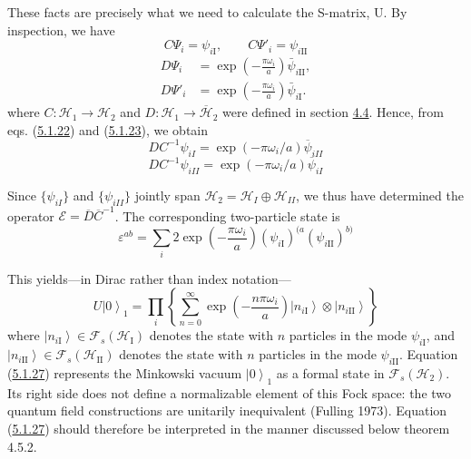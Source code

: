 \documentclass[11pt,a4paper]{article}
\providecommand{\ket}[1]{\left\lvert#1\right\rangle}
\begin{document}
These facts are precisely what we need to calculate the S-matrix, U. By inspection, we have
\begin{equation*}
C\Psi_i=\psi_{i\mathrm{I}},\qquad C\Psi'_i=\psi_{i\mathrm{II}} \tag{5.1.22}\label{eq:5.1.22}
\end{equation*}
\begin{equation*}
\begin{aligned}
D\Psi_i&=\exp\left(-\frac{\pi\omega_i}{a}\right)\bar\psi_{i\mathrm{II}},\\
D\Psi'_i&=\exp\left(-\frac{\pi\omega_i}{a}\right)\bar\psi_{i\mathrm{I}}.
\end{aligned}\tag{5.1.23}\label{eq:5.1.23}
\end{equation*}
where \(C: \mathcal{H}_1 \to \mathcal{H}_2\) and \(D: \mathcal{H}_1 \to \overline{\mathcal{H}}_2\) were defined in section \hyperlink{sec:4.4}{4.4}. Hence, from eqs. (\hyperref[eq:5.1.22]{5.1.22}) and (\hyperref[eq:5.1.23]{5.1.23}), we obtain
\begin{equation*}
DC^{-1}\psi_{iI} = \exp(-\pi\omega_i/a) \overline{\psi}_{iII} \tag{5.1.24}\label{eq:5.1.24}
\end{equation*}
\begin{equation*}
DC^{-1}\psi_{iII} = \exp(-\pi\omega_i/a) \overline{\psi}_{iI} \tag{5.1.25}\label{eq:5.1.25}
\end{equation*}

Since \(\{\psi_{iI}\}\) and \(\{\psi_{iII}\}\) jointly span \(\mathcal{H}_2 = \mathcal{H}_I \oplus \mathcal{H}_{II}\), we thus have determined the operator \(\mathcal{E} = \overline{D} \overline{C}^{-1}\). The corresponding two-particle state is
\begin{equation*}
\varepsilon^{ab}=\sum_i 2\exp\left(-\frac{\pi\omega_i}{a}\right)(\psi_{i\mathrm{I}})^{(a}(\psi_{i\mathrm{II}})^{b)} \tag{5.1.26}\label{eq:5.1.26}
\end{equation*}

This yields---in Dirac rather than index notation---
\begin{equation*}
U\ket{0}_1=\prod_i\left\{\sum_{n=0}^{\infty}
\exp\left(-\frac{n\pi\omega_i}{a}\right)
\ket{n_{i\mathrm{I}}}\otimes\ket{n_{i\mathrm{II}}}\right\} \tag{5.1.27}\label{eq:5.1.27}
\end{equation*}
where \(\ket{n_{i\mathrm{I}}}\in\mathcal{F}_s(\mathcal{H}_{\mathrm{I}})\) denotes the state with \(n\) particles in the mode \(\psi_{i\mathrm{I}}\), and \(\ket{n_{i\mathrm{II}}}\in\mathcal{F}_s(\mathcal{H}_{\mathrm{II}})\) denotes the state with \(n\) particles in the mode \(\psi_{i\mathrm{II}}\). Equation (\hyperref[eq:5.1.27]{5.1.27}) represents the Minkowski vacuum \(\ket{0}_1\) as a formal state in \(\mathcal{F}_s(\mathcal{H}_2)\). Its right side does not define a normalizable element of this Fock space: the two quantum field constructions are unitarily inequivalent (Fulling 1973). Equation (\hyperref[eq:5.1.27]{5.1.27}) should therefore be interpreted in the manner discussed below theorem 4.5.2.
\end{document}
